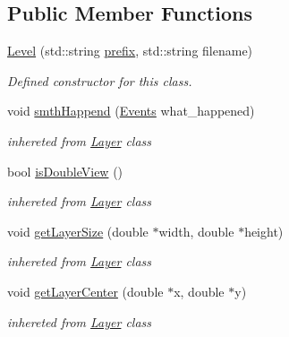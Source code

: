 \subsection*{Public Member Functions}
\begin{DoxyCompactItemize}
\item 
\hyperlink{class_level_ae66cbb137b426e4dd1c9f0566ca04aa1}{Level} (std\+::string \hyperlink{class_level_a08f8815ed6a37bb8b1a2c045946cdd68}{prefix}, std\+::string filename)
\begin{DoxyCompactList}\small\item\em Defined constructor for this class. \end{DoxyCompactList}\item 
\mbox{\label{class_level_a4e898cb21d15947077dbedfb979c63be}} 
void \hyperlink{class_level_a4e898cb21d15947077dbedfb979c63be}{smth\+Happend} (\hyperlink{_events_8h_af60e00b78607064c5be6aa9397ea49c1}{Events} what\+\_\+happened)
\begin{DoxyCompactList}\small\item\em inhereted from \hyperlink{class_layer}{Layer} class \end{DoxyCompactList}\item 
\mbox{\label{class_level_ae3584a92caee4cf544abd2c4f946cb18}} 
bool \hyperlink{class_level_ae3584a92caee4cf544abd2c4f946cb18}{is\+Double\+View} ()
\begin{DoxyCompactList}\small\item\em inhereted from \hyperlink{class_layer}{Layer} class \end{DoxyCompactList}\item 
\mbox{\label{class_level_a7909f2ebe4d0f676adf9c84db2c1abc8}} 
void \hyperlink{class_level_a7909f2ebe4d0f676adf9c84db2c1abc8}{get\+Layer\+Size} (double $\ast$width, double $\ast$height)
\begin{DoxyCompactList}\small\item\em inhereted from \hyperlink{class_layer}{Layer} class \end{DoxyCompactList}\item 
\mbox{\label{class_level_a4c49b93b4c3060fd650890790fc677e9}} 
void \hyperlink{class_level_a4c49b93b4c3060fd650890790fc677e9}{get\+Layer\+Center} (double $\ast$x, double $\ast$y)
\begin{DoxyCompactList}\small\item\em inhereted from \hyperlink{class_layer}{Layer} class \end{DoxyCompactList}\item 

\end{DoxyCompactItemize}
